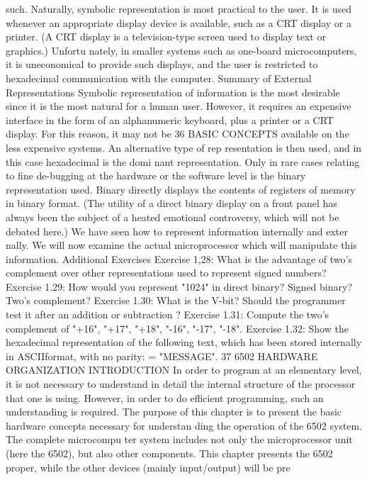 \documentclass{book}
\begin{document}
such. Naturally, symbolic representation is most practical to the
user. It is used whenever an appropriate display device is
available, such as a CRT display or a printer. (A CRT display is a
television-type screen used to display text or graphics.) Unfortu
nately, in smaller systems such as one-board microcomputers, it is
uneconomical to provide such displays, and the user is restricted
to hexadecimal communication with the computer.
Summary of External Representations
Symbolic representation of information is the most desirable
since it is the most natural for a human user. However, it requires
an expensive interface in the form of an alphanumeric keyboard,
plus a printer or a CRT display. For this reason, it may not be
36
BASIC CONCEPTS
available on the less expensive systems. An alternative type of rep
resentation is then used, and in this case hexadecimal is the domi
nant representation. Only in rare cases relating to fine de-bugging
at the hardware or the software level is the binary representation
used. Binary directly displays the contents of registers of memory
in binary format.
(The utility of a direct binary display on a front panel has always
been the subject of a heated emotional controversy, which will not
be debated here.)
We have seen how to represent information internally and exter
nally. We will now examine the actual microprocessor which will
manipulate this information.
Additional Exercises
Exercise 1,28: What is the advantage of two's complement over other
representations used to represent signed numbers?
Exercise 1.29: How would you represent "1024" in direct binary? Signed
binary? Two's complement?
Exercise 1.30: What is the V-bit? Should the programmer test it after an
addition or subtraction ?
Exercise 1.31: Compute the two's complement of "+16", "+17",
"+18", "-16", "-17", "-18".
Exercise 1.32: Show the hexadecimal representation of the following
text, which has been stored internally in ASCIIformat, with no parity:
= "MESSAGE".
37
6502 HARDWARE ORGANIZATION
INTRODUCTION
In order to program at an elementary level, it is not necessary
to understand in detail the internal structure of the processor
that one is using. However, in order to do efficient programming,
such an understanding is required. The purpose of this chapter is
to present the basic hardware concepts necessary for understan
ding the operation of the 6502 system. The complete microcompu
ter system includes not only the microprocessor unit (here the
6502), but also other components. This chapter presents the 6502
proper, while the other devices (mainly input/output) will be pre
\end{document}
